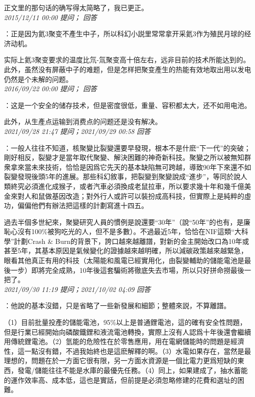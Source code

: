 \documentclass[twocolumn]{ctexart}
\begin{document}
正文里的那句话的确写得太简略了，我已更正。\\

\textit{\hfill\noindent\small 2015/12/11 00:00 提问； 回答}

：正是因为氦3聚变不產生中子，所以科幻小説里常常拿开采氦3作为殖民月球的经济动机。

实际上氦3聚变要求的温度比氘-氚聚变高十倍左右，远非目前的技术所能达到的。此外，虽然没有屏蔽中子的难题，但是怎样把聚变產生的热能有效地取出用以发电仍然是个未解的问题。\\

\textit{\hfill\noindent\small 2016/09/22 00:00 提问； 回答}

：这是一个安全的储存技术，但是密度很低，重量、容积都太大，还不如用电池。

此外，从生產点运输到消费点的问题还是没有解决。\\

\textit{\hfill\noindent\small 2021/09/28 21:47 提问；2021/09/29 00:58 回答}

：一般人往往不知道，核聚變比裂變還要早發現，根本不是什麽“下一代”的突破；剛好相反，裂變才是當年取代聚變、解決困難的神奇新科技。聚變之所以被無知群衆拿來當未來技術，恰恰是因爲它先天的基本缺陷無可跨越，導致90年下來還不如裂變發現後頭5年的進展。那些科幻敘事，把裂變到聚變說成“進步”，等同於說人類終究必須進化成猴子，或者汽車必須換成老鼠拉車，所以要求幾十年和幾千億美金來對人和鼠做基因改造；對外行人或許可以裝扮成高科技，但實際上是純粹的虛功，偏偏他們有辦法把這樣的計劃寫進十四五。

過去半個多世紀來，聚變研究人員的慣例是說還要“30年”（說“50年”的也有，是廉恥心沒有100\%被狗吃光的人，但不是多數）。不過最近5年，恰恰在NIF這類“大科學”計劃Crash \& Burn的背景下，誇口越來越離譜，對新的金主開始改口為10年或甚至5年，其基本原因是氣候變化的證據越來越明確，所以減碳政策越來越緊急，眼看其他真正有用的科技（太陽能和風電已經實用化，由裂變輔助的儲能電池是最後一步）即將完全成熟，10年後這套騙術將徹底失去市場，所以只好拼命撈最後一把了。
\\

\textit{\hfill\noindent\small 2021/09/30 11:19 提问；2021/10/02 04:09 回答}

：他說的基本沒錯，只是省略了一些新發展和細節；整體來説，不算離譜。

（1）目前批量投產的儲能電池，95\%以上是普通鋰電池，這的確有安全性問題，但是行業已經開始向磷酸鐵鋰和液流電池轉換，實際上沒有人認爲十年後還會繼續用傳統鋰電池。（2）氫能的危險性在於零售應用，用在電網儲能時的問題是經濟性，這一點沒有錯，不過我始終也是這麽解釋的啊。（3）水電如果存在，當然是最理想的，問題在於一方面它很有限，另一方面水資源是一個比電力更爲短缺的東西，發電/儲能往往不能是水庫的最優先任務。（4）同上，如果建成了，抽水蓄能的運作效率高、成本低，這也是實話，但前提是必須忽略修建的花費和選址的困難。
\end{document}
